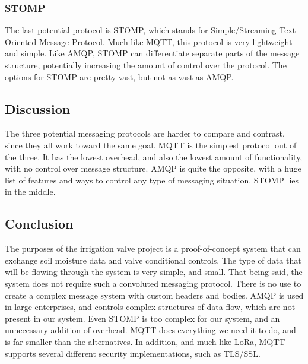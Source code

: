 \documentclass[onecolumn, draftclsnofoot,10pt, compsoc]{IEEEtran}
\begin{document}
    \subsubsection{STOMP}
    The last potential protocol is STOMP, which stands for Simple/Streaming Text Oriented Message Protocol. 
    Much like MQTT, this protocol is very lightweight and simple. 
    Like AMQP, STOMP can differentiate separate parts of the message structure, potentially increasing the amount of control over the protocol. 
    The options for STOMP are pretty vast, but not as vast as AMQP.
    \subsection{Discussion}
    The three potential messaging protocols are harder to compare and contrast, since they all work toward the same goal.
    MQTT is the simplest protocol out of the three.
    It has the lowest overhead, and also the lowest amount of functionality, with no control over message structure.
    AMQP is quite the opposite, with a huge list of features and ways to control any type of messaging situation. 
    STOMP lies in the middle.
    
    \subsection{Conclusion}
    The purposes of the irrigation valve project is a proof-of-concept system that can exchange soil moisture data and valve conditional controls.
    The type of data that will be flowing through the system is very simple, and small. 
    That being said, the system does not require such a convoluted messaging protocol. 
    There is no use to create a complex message system with custom headers and bodies. 
    AMQP is used in large enterprises, and controls complex structures of data flow, which are not present in our system. 
    Even STOMP is too complex for our system, and an unnecessary addition of overhead. 
    MQTT does everything we need it to do, and is far smaller than the alternatives. 
    In addition, and much like LoRa, MQTT supports several different security implementations, such as TLS/SSL.
    
    


	
	\pagebreak
	\newpage
	
\end{document}

